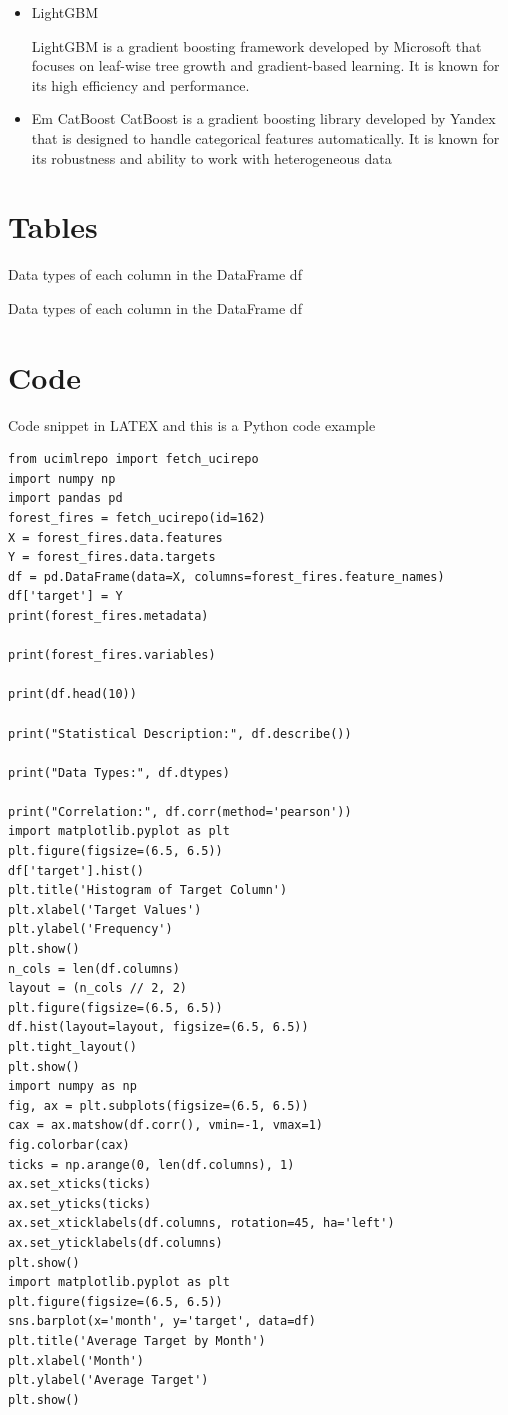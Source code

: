 \begin{itemize}
\item LightGBM

LightGBM is a gradient boosting framework developed by Microsoft that focuses on leaf-wise tree growth and gradient-based learning. It is known for its high efficiency and performance.

\item Em CatBoost
CatBoost is a gradient boosting library developed by Yandex that is designed to handle categorical features automatically. It is known for its robustness and ability to work with heterogeneous data
\end{itemize}


\section{Tables}
Data types of each column in the DataFrame df \\
\begin{table}[ht!]
    \centering
    
    \label{tab:Datatypes}
    \caption{Data types of each column in the DataFrame df}
\end{table}

\clearpage
\section{Code}
Code snippet in LATEX and this is a Python code example
\begin{lstlisting}
from ucimlrepo import fetch_ucirepo
import numpy np
import pandas pd
forest_fires = fetch_ucirepo(id=162)
X = forest_fires.data.features
Y = forest_fires.data.targets
df = pd.DataFrame(data=X, columns=forest_fires.feature_names)
df['target'] = Y
print(forest_fires.metadata)

print(forest_fires.variables)

print(df.head(10))

print("Statistical Description:", df.describe())

print("Data Types:", df.dtypes)

print("Correlation:", df.corr(method='pearson'))
import matplotlib.pyplot as plt
plt.figure(figsize=(6.5, 6.5))
df['target'].hist()
plt.title('Histogram of Target Column')
plt.xlabel('Target Values')
plt.ylabel('Frequency')
plt.show()
n_cols = len(df.columns)
layout = (n_cols // 2, 2)
plt.figure(figsize=(6.5, 6.5))
df.hist(layout=layout, figsize=(6.5, 6.5))
plt.tight_layout()
plt.show()
import numpy as np
fig, ax = plt.subplots(figsize=(6.5, 6.5))
cax = ax.matshow(df.corr(), vmin=-1, vmax=1)
fig.colorbar(cax)
ticks = np.arange(0, len(df.columns), 1)
ax.set_xticks(ticks)
ax.set_yticks(ticks)
ax.set_xticklabels(df.columns, rotation=45, ha='left')
ax.set_yticklabels(df.columns)
plt.show()
import matplotlib.pyplot as plt
plt.figure(figsize=(6.5, 6.5))
sns.barplot(x='month', y='target', data=df)
plt.title('Average Target by Month')
plt.xlabel('Month')
plt.ylabel('Average Target')
plt.show()
\end{lstlisting}

